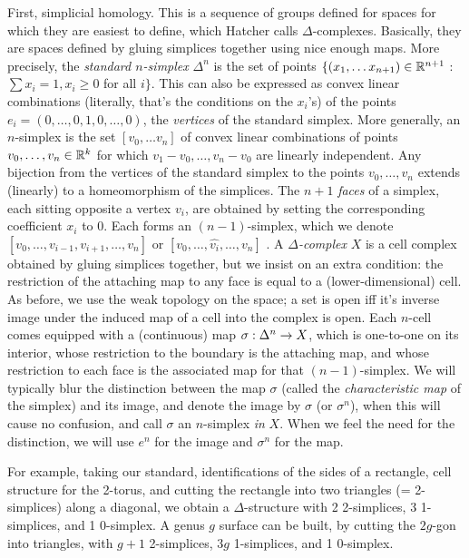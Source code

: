First, simplicial homology. This is a sequence of groups defined for spaces
for which they are easiest to define, which Hatcher calls $\Delta$-complexes.
Basically, they are spaces defined by gluing simplices together using
nice enough maps. More precisely, the {\it standard $n$-simplex} $\Delta^n$ is
the set of points 
$\{(x_1,\ldots x_{n+1})\in{\Bbb R}^{n+1}$ : $\sum x_i=1 , x_i\geq 0$
 for all $i\}$. This can also be expressed as convex linear combinations
(literally, that's the conditions on the $x_i$'s) of the points
$e_i=(0,\ldots ,0,1,0,\ldots ,0)$, the {\it vertices} of the standard
simplex. More generally, an $n$-simplex is the set $[v_0,\ldots v_n]$ of
convex linear combinations of points $v_0,\ldots ,v_n\in{\Bbb R}^{k}$
for which $v_1-v_0,\ldots ,v_n-v_0$ are linearly independent.
Any bijection from the vertices of the standard simplex to the points
$v_0,\ldots ,v_n$ extends (linearly) to a homeomorphism of
the simplices. The $n+1$ {\it faces} of a simplex, each sitting opposite
a vertex $v_i$, are obtained by setting the corresponding coefficient $x_i$ to $0$. 
Each forms an $(n-1)$-simplex, which we denote 
$[v_0,\ldots,v_{i-1},v_{i+1},\ldots ,v_n]$ or
$[v_0,\ldots,\widehat{v_{i}},\ldots ,v_n]$ . A {\it $\Delta$-complex} $X$ is a cell
complex obtained by gluing simplices together, but we insist on an extra
condition:
the restriction of the attaching map to any face is equal to a (lower-dimensional)
cell. As before, we use the weak topology on the space; a set is open iff
it's inverse image under the induced map of a cell into the complex is open.
Each $n$-cell comes equipped with a (continuous) map
$\sigma:\Delta^n\rightarrow X$, which is one-to-one on its interior, whose restriction
to the boundary is the attaching map, and whose restriction to each face is the
associated map for that $(n-1)$-simplex. We will typically blur the 
distinction between the map $\sigma$ (called the {\it characteristic map}
of the simplex) and its image, and denote the
image by $\sigma$ (or $\sigma^n$), when this will cause no confusion,
and call $\sigma$ an $n$-simplex {\it in} $X$. When we feel the need for the 
distinction, we will use $e^n$ for the image and $\sigma^n$ for the map.

\ssk

For example, taking our standard,
identifications of the sides of a rectangle, cell structure for the 2-torus,
and cutting the rectangle into two triangles (= 2-simplices) along a diagonal,
we obtain a $\Delta$-structure with 2 2-simplices, 3 1-simplices, and 1 0-simplex.
A genus $g$ surface can be built, by cutting the $2g$-gon into triangles, with
$g+1$ 2-simplices, $3g$ 1-simplices, and 1 0-simplex.


